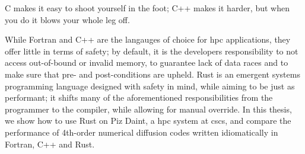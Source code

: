 \documentclass[british]{scrreprt}
\begin{document}
% 
% 
% 
% 

\begin{displayquote}
	C makes it easy to shoot yourself in the foot; C++ makes it harder, but when you do it blows your whole leg off.
\end{displayquote}

While Fortran and C++ are the langauges of choice for \gls{hpc} applications, they offer little in terms of safety; by default, it is the developers responsibility to not access out-of-bound or invalid memory, to guarantee lack of data races and to make sure that pre- and post-conditions are upheld. Rust is an emergent systems programming language designed with safety in mind, while aiming to be just as performant; it shifts many of the aforementioned responsibilities from the programmer to the compiler, while allowing for manual override. In this thesis, we show how to use Rust on Piz Daint, a \gls{hpc} system at \gls{cscs}, and compare the performance of 4th-order numerical diffusion codes written idiomatically in Fortran, C++ and Rust.
\end{document}
